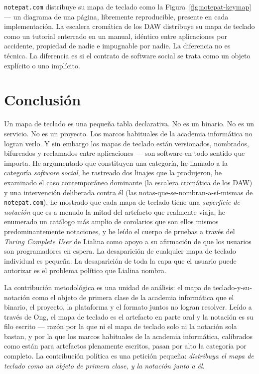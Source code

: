 \documentclass[10pt,letterpaper,twocolumn]{article}
\begin{document}
\texttt{notepat.com} distribuye su mapa de teclado como la Figura~\ref{fig:notepat-keymap} --- un diagrama de una página, libremente reproducible, presente en cada implementación. La escalera cromática de los DAW distribuye su mapa de teclado como un tutorial enterrado en un manual, idéntico entre aplicaciones por accidente, propiedad de nadie e impugnable por nadie. La diferencia no es técnica. La diferencia es si el contrato de software social se trata como un objeto explícito o uno implícito.

\section{Conclusión}

Un mapa de teclado es una pequeña tabla declarativa. No es un binario. No es un servicio. No es un proyecto. Los marcos habituales de la academia informática no logran verlo. Y sin embargo los mapas de teclado están versionados, nombrados, bifurcados y reclamados entre aplicaciones --- son software en todo sentido que importa. He argumentado que constituyen una categoría, he llamado a la categoría \emph{software social}, he rastreado dos linajes que la produjeron, he examinado el caso contemporáneo dominante (la escalera cromática de los DAW) y una intervención deliberada contra él (las notas-que-se-nombran-a-sí-mismas de \texttt{notepat.com}), he mostrado que cada mapa de teclado tiene una \emph{superficie de notación} que es a menudo la mitad del artefacto que realmente viaja, he enumerado un catálogo más amplio de corolarios que son ellos mismos predominantemente notaciones, y he leído el cuerpo de pruebas a través del \emph{Turing Complete User} de Lialina como apoyo a su afirmación de que los usuarios son programadores en espera. La desaparición de cualquier mapa de teclado individual es pequeña. La desaparición de toda la capa que el usuario puede autorizar es el problema político que Lialina nombra.

La contribución metodológica es una unidad de análisis: el mapa de teclado-y-su-notación como el objeto de primera clase de la academia informática que el binario, el proyecto, la plataforma y el formato juntos no logran resolver. Leído a través de Ong, el mapa de teclado es el artefacto en parte oral y la notación es su filo escrito --- razón por la que ni el mapa de teclado solo ni la notación sola bastan, y por la que los marcos habituales de la academia informática, calibrados como están para artefactos plenamente escritos, pasan por alto la categoría por completo. La contribución política es una petición pequeña: \emph{distribuya el mapa de teclado como un objeto de primera clase, y la notación junto a él}.
\end{document}
